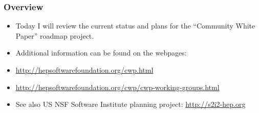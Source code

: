 \begin{frame}
\frametitle{Overview}

\begin{itemize}
\item Today I will review the current status and plans for the ``Community White Paper'' roadmap project.
\item Additional information can be found on the webpages:
\item \url{http://hepsoftwarefoundation.org/cwp.html}
\item \url{http://hepsoftwarefoundation.org/cwp/cwp-working-groups.html}
\item See also US NSF Software Institute planning project: \url{http://s2i2-hep.org}
\end{itemize}

\end{frame}


